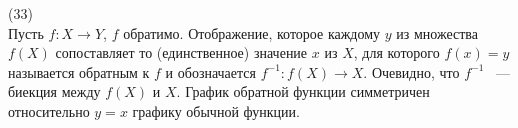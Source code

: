 (33)\\
Пусть $f: X \to Y$, $f$ обратимо. Отображение, которое каждому $y$ из множества $f(X)$ сопоставляет то (единственное) значение $x$ из $X$, для которого $f(x) = y$ называется обратным к $f$ и обозначается $f^{-1}: f(X) \to X$. Очевидно, что $f^{-1}$ ~--- биекция между $f(X)$ и $X$. График обратной функции симметричен относительно $y=x$ графику обычной функции.